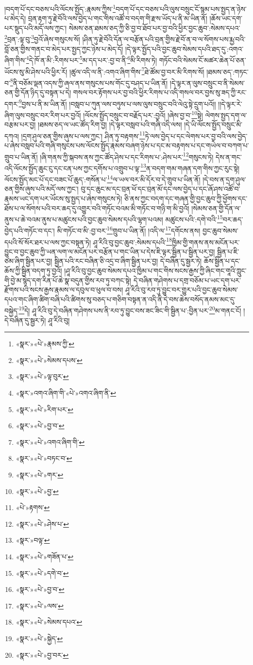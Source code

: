 །བདག་པོ་དང་བཅས་པའི་ལོངས་སྤྱོད་:རྣམས་ཀྱིས་\footnote{«སྣར་»«པེ་»རྣམས་ཀྱི་}བདག་པོ་དང་བཅས་པའི་ལུས་བསྲུང་ངོ་སྙམ་པས་སྤྱད་ན་ཉེས་པ་མེད་དེ། བྲན་རྟག་ཏུ་རྗེ་བོའི་ལས་བྱེད་པ་གང་གིས་འཚོ་བ་བདག་གི་རྫས་ཡོད་པ་ནི་མ་ཡིན་ནོ། །ཆོས་ཡང་དག་པར་སྡུད་པའི་མདོ་ལས་ཀྱང་། སེམས་ཅན་ཐམས་ཅད་ཀྱི་ཅི་བྱ་བ་ཐོབ་པར་བྱ་བའི་ཕྱིར་བྱང་ཆུབ་:སེམས་དཔའ་\footnote{«སྣར་»«པེ་»སེམས་དཔས་}བྲན་:ལྟ་བུ་\footnote{«སྣར་»«པེ་»ལྟ་བུར་}བྱའོ་ཞེས་གསུངས་སོ། །ཤིན་ཏུ་རྗེ་བོའི་དོན་ལ་བརྩོན་པའི་བྲན་གྱིས་རྗེ་བོ་ན་བ་ལ་སོགས་པས་རྨྱ་བའི་བློ་ཅན་གྱིས་གནང་བ་མེད་པར་སྤྱད་ཀྱང་ཉེས་པ་མེད་དོ། །དེ་ལྟར་སྤྱོད་པའི་བྱང་ཆུབ་སེམས་དཔའི་ཐད་དུ་:འགའ་ཞིག་གིས་\footnote{«སྣར་»འགའ་ཞིག་གི་«པེ་»འགའ་ཞིག་ནི་}དེ་ཁོ་ན་མི་:རིགས་པར་\footnote{«སྣར་»«པེ་»རིག་པར་}མ་དད་པར་:བྱ་བ་ནི་\footnote{«སྣར་»«པེ་»བྱ་བ་}མི་རིགས་ཏེ། གཏོང་བའི་སེམས་ངོ་མཚར་ཆེན་པོ་ཅན་ཡོངས་སུ་མི་ཤེས་པའི་ཕྱིར་རོ། །ཚུལ་འདི་ལ་ནི་:འགའ་ཞིག་གིས་\footnote{«སྣར་»«པེ་»འགའ་ཞིག་གི་}ཐེ་ཚོམ་བྱ་བར་མི་རིགས་སོ། །ཐམས་ཅད་:གཏང་བ་\footnote{«སྣར་»«པེ་»བཏང་བ་}ནི་བཅོམ་ལྡན་འདས་ཀྱི་ཞལ་ནས་གསུངས་པས་གོང་དུ་བཤད་པ་ཡིན་ནོ། །དེ་ལྟར་ན་ལུས་བསྲུང་བ་ནི་སེམས་ཅན་གྱི་དོན་ཉིད་དུ་བསྟན་པ་དེ། གསལ་བར་རྟོགས་པར་བྱ་བའི་ཕྱིར་རིགས་པ་འདི་གསལ་བར་བྱས་སུ་ཟད་ཀྱི་རང་དགར་\footnote{«སྣར་»«པེ་»གར་}བྱས་པ་ནི་མ་ཡིན་ནོ། །བསླབ་པ་ཀུན་ལས་བཏུས་པ་ལས་ལུས་བསྲུང་བའི་ལེའུ་སྟེ་དྲུག་པའོ།། །།དེ་ལྟར་རེ་ཞིག་ལུས་བསྲུང་བར་རིག་པར་བྱའོ། །ལོངས་སྤྱོད་བསྲུང་བ་བརྗོད་པར་:བྱའོ། །ཞེས་བྱ་བ་\footnote{«སྣར་»«པེ་»བྱ་}སྟེ། ལེགས་སྤྱད་དག་ལ་བརྩམ་པར་བྱ། །ཐམས་ཅད་ལ་ཡང་ཚོད་རིག་བྱ། །དེ་ལྟར་བསླབ་པའི་གཞི་འདི་ལས། །དེ་ཡི་ལོངས་སྤྱོད་བསྲུང་མི་དཀའ། །དྲག་ཤུལ་ཅན་གྱིས་ཞུས་པ་ལས་ཀྱང་། ཤིན་ཏུ་བརྟགས་\footnote{«པེ་»རྟགས་}ཏེ་ལས་བྱེད་པ་དང་ལེགས་པར་བྱ་བའི་ལས་བྱེད་པ་ཞེས་བསླབ་པའི་གཞི་གསུངས་པས་ལོངས་སྤྱོད་རྣམས་བཞག་ཉེས་པ་དང་མ་བརྟགས་པ་དང་གཡེལ་བ་བཀག་པ་གྲུབ་པ་ཡིན་ནོ། །ཞི་གནས་ཀྱི་སྐབས་ནས་ཀྱང་ཚོད་ཤེས་པ་དང་རིགས་པ་:ཤེས་པར་\footnote{«སྣར་»«པེ་»ཤེས་པ་}གསུངས་ཏེ། དེས་ན་གང་འདི་ལོངས་སྤྱོད་ཆུང་ངུ་དང་ངན་པས་ཀྱང་དགོས་པ་འགྲུབ་པ་ལྟ་\footnote{«སྣར་»བལྟ་}ན་བདག་གམ་གཞན་དག་གིས་ཀྱང་རུང་སྟེ། ལོངས་སྤྱོད་མང་པོ་དང་བཟང་པོ་ཆུད་:གསོན་པ་\footnote{«སྣར་»«པེ་»གཟོན་པ་}ལ་ཡལ་བར་མི་དོར་བ་དེ་གྲུབ་པ་ཡིན་ནོ། །དེ་བས་ན་དྲག་ཤུལ་ཅན་གྱིས་ཞུས་པའི་མདོ་ལས་ཀྱང་། བུ་དང་ཆུང་མ་དང་བྲན་ཕོ་དང་བྲན་མོ་དང་ལས་བྱེད་པ་དང་ཞོ་ཤས་འཚོ་བ་རྣམས་ཡང་དག་པར་ཡོངས་སུ་སྤྱད་པ་ཞེས་གསུངས་ཏེ། ཅི་ནས་ཀྱང་བདག་དང་གཞན་གྱི་བྱང་ཆུབ་ཀྱི་ཕྱོགས་དང་ཐོས་པ་ལ་སོགས་པའི་བར་ཆད་དུ་འགྱུར་བའི་གཏོང་བའམ་མི་གཏོང་བ་གཉི་ག་མི་བྱའོ། །སེམས་ཅན་གྱི་དོན་ལ་ནུས་པ་ཆེ་བའམ་ནུས་པ་མཚུངས་པའི་བྱང་ཆུབ་སེམས་དཔའི་ལྷག་པའམ། མཚུངས་པའི་:དགེ་བའི་\footnote{«སྣར་»«པེ་»དགེ་བ་}བར་ཆད་བྱེད་པའི་གཏོང་བ་དང་། མི་གཏོང་བ་མི་:བྱ་བར་\footnote{«སྣར་»«པེ་»བྱ་བ་}གྲུབ་པ་ཡིན་ནོ། །འདི་ལ་\footnote{«སྣར་»«པེ་»ལས་}དགོངས་ནས། བྱང་ཆུབ་སེམས་དཔའི་སོ་སོར་ཐར་པ་ལས་ཀྱང་བསྟན་ཏེ། ཤཱ་རིའི་བུ་བྱང་ཆུབ་:སེམས་དཔའི་\footnote{«སྣར་»«པེ་»སེམས་དཔའ་}ཁྱིམ་གྱི་གནས་ནས་མངོན་པར་བྱུང་བ་བྱང་ཆུབ་ཀྱི་ཡན་ལག་ལ་མངོན་པར་བརྩོན་པ་གང་ཡིན་པ་དེས་ཇི་ལྟར་སྦྱིན་པ་སྦྱིན་པར་བྱ། སྦྱིན་པ་ཇི་ཙམ་ཞིག་སྦྱིན་པར་བྱ། སྦྱིན་པའི་རང་བཞིན་ཅི་འདྲ་བ་ཞིག་སྦྱིན་པར་བྱ། དེ་བཞིན་དུ་སྦྱར་ཏེ། ཆོས་སྦྱིན་པ་དང་ཆོས་ཀྱི་སྦྱིན་བདག་ཏུ་བྱའོ། །ཤཱ་རིའི་བུ་བྱང་ཆུབ་སེམས་དཔའ་ཁྱིམ་པ་གང་གིས་སངས་རྒྱས་ཀྱི་ཞིང་གང་གཱའི་ཀླུང་གི་བྱེ་མ་སྙེད་དག་རིན་པོ་ཆེ་སྣ་བདུན་གྱིས་རབ་ཏུ་བཀང་སྟེ། དེ་བཞིན་གཤེགས་པ་དགྲ་བཅོམ་པ་ཡང་དག་པར་རྫོགས་པའི་སངས་རྒྱས་རྣམས་ལ་དབུལ་བ་ཕུལ་བ་བས། ཤཱ་རིའི་བུ་རབ་ཏུ་བྱུང་བར་གྱུར་པའི་བྱང་ཆུབ་སེམས་དཔའ་གང་ཞིག་ཚིག་བཞི་པའི་ཚིགས་སུ་བཅད་པ་གཅིག་བསྟན་ན་འདི་ནི་དེ་བས་ཆེས་བསོད་ནམས་མང་དུ་བསྐྱེད་\footnote{«སྣར་»«པེ་»སྐྱེད་}དེ། ཤཱ་རིའི་བུ་དེ་བཞིན་གཤེགས་པས་ནི་རབ་ཏུ་བྱུང་བས་ཟང་ཟིང་གི་སྦྱིན་པ་:བྱིན་པར་\footnote{«སྣར་»«པེ་»བྱ་བར་}མ་གནང་ངོ། །དེ་བཞིན་དུ་སྦྱར་ཏེ། ཤཱ་རིའི་བུ། 